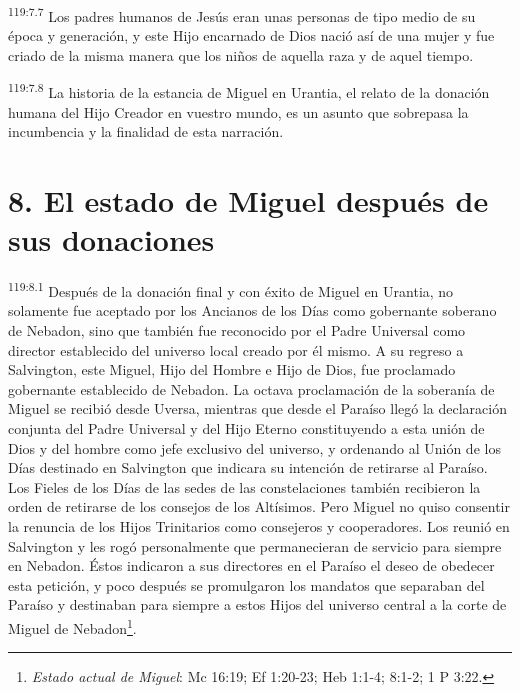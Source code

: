 \par
\textsuperscript{119:7.7} Los padres humanos de Jesús eran unas personas de tipo medio de su época y generación, y este Hijo encarnado de Dios nació así de una mujer y fue criado de la misma manera que los niños de aquella raza y de aquel tiempo.

\par
\textsuperscript{119:7.8} La historia de la estancia de Miguel en Urantia, el relato de la donación humana del Hijo Creador en vuestro mundo, es un asunto que sobrepasa la incumbencia y la finalidad de esta narración.

\section*{8. El estado de Miguel después de sus donaciones}
\par
\textsuperscript{119:8.1} Después de la donación final y con éxito de Miguel en Urantia, no solamente fue aceptado por los Ancianos de los Días como gobernante soberano de Nebadon, sino que también fue reconocido por el Padre Universal como director establecido del universo local creado por él mismo. A su regreso a Salvington, este Miguel, Hijo del Hombre e Hijo de Dios, fue proclamado gobernante establecido de Nebadon. La octava proclamación de la soberanía de Miguel se recibió desde Uversa, mientras que desde el Paraíso llegó la declaración conjunta del Padre Universal y del Hijo Eterno constituyendo a esta unión de Dios y del hombre como jefe exclusivo del universo, y ordenando al Unión de los Días destinado en Salvington que indicara su intención de retirarse al Paraíso. Los Fieles de los Días de las sedes de las constelaciones también recibieron la orden de retirarse de los consejos de los Altísimos. Pero Miguel no quiso consentir la renuncia de los Hijos Trinitarios como consejeros y cooperadores. Los reunió en Salvington y les rogó personalmente que permanecieran de servicio para siempre en Nebadon. Éstos indicaron a sus directores en el Paraíso el deseo de obedecer esta petición, y poco después se promulgaron los mandatos que separaban del Paraíso y destinaban para siempre a estos Hijos del universo central a la corte de Miguel de Nebadon\footnote{\textit{Estado actual de Miguel}: Mc 16:19; Ef 1:20-23; Heb 1:1-4; 8:1-2; 1 P 3:22.}.

